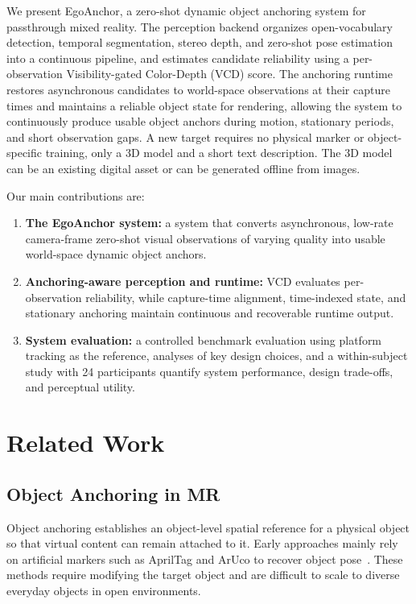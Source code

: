 \documentclass[review]{vgtc}
\begin{document}
We present EgoAnchor, a zero-shot dynamic object anchoring system for passthrough mixed reality. The perception backend organizes open-vocabulary detection, temporal segmentation, stereo depth, and zero-shot pose estimation into a continuous pipeline, and estimates candidate reliability using a per-observation Visibility-gated Color-Depth (VCD) score. The anchoring runtime restores asynchronous candidates to world-space observations at their capture times and maintains a reliable object state for rendering, allowing the system to continuously produce usable object anchors during motion, stationary periods, and short observation gaps. A new target requires no physical marker or object-specific training, only a 3D model and a short text description. The 3D model can be an existing digital asset or can be generated offline from images.

Our main contributions are:
\begin{enumerate}[leftmargin=1.8em,itemsep=1pt,topsep=2pt]
  \item \textbf{The EgoAnchor system:} a system that converts asynchronous, low-rate camera-frame zero-shot visual observations of varying quality into usable world-space dynamic object anchors.
  \item \textbf{Anchoring-aware perception and runtime:} VCD evaluates per-observation reliability, while capture-time alignment, time-indexed state, and stationary anchoring maintain continuous and recoverable runtime output.
  \item \textbf{System evaluation:} a controlled benchmark evaluation using platform tracking as the reference, analyses of key design choices, and a within-subject study with 24 participants quantify system performance, design trade-offs, and perceptual utility.
\end{enumerate}

\section{Related Work}\label{sec:related-work}

\subsection{Object Anchoring in MR}

Object anchoring establishes an object-level spatial reference for a physical object so that virtual content can remain attached to it. Early approaches mainly rely on artificial markers such as AprilTag and ArUco to recover object pose~\cite{apriltag2011,aruco2014}. These methods require modifying the target object and are difficult to scale to diverse everyday objects in open environments.
\end{document}
